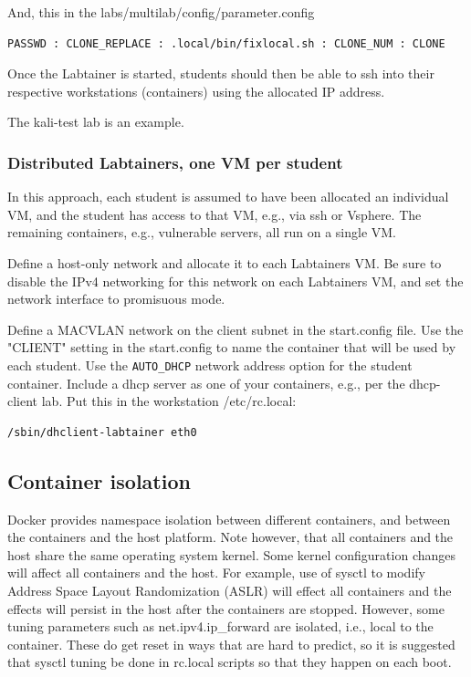 \documentclass[12pt]{article}
\begin{document}
\noindent And, this in the labs/multilab/config/parameter.config
\begin{verbatim}
PASSWD : CLONE_REPLACE : .local/bin/fixlocal.sh : CLONE_NUM : CLONE
\end{verbatim}

Once the Labtainer is started, students should then be able to ssh into their
respective workstations (containers) using the allocated IP address.

The kali-test lab is an example.

\subsubsection {Distributed Labtainers, one VM per student}
In this approach, each student is assumed to have been allocated an
individual VM,
and the student has access to that VM, e.g., via ssh or Vsphere.  The
remaining containers, e.g., vulnerable servers, all run on a single VM.

Define a host-only network and allocate it to each Labtainers VM.  Be sure
to disable the IPv4 networking for this network on each Labtainers VM, and
set the network interface to promisuous mode.

Define a MACVLAN network on the client subnet in the start.config file.
Use the "CLIENT" setting in the start.config to name the container that will
be used by each student. Use the {\tt AUTO\_DHCP} network address option 
for the student container.   Include a dhcp server as one of your containers,
e.g., per the dhcp-client lab.  Put this in the workstation /etc/rc.local:
\begin{verbatim}
/sbin/dhclient-labtainer eth0
\end{verbatim}


\subsection {Container isolation}
Docker provides namespace isolation between different containers, and
between the containers and the host platform.  Note however, that all
containers and the host share the same operating system kernel.  Some
kernel configuration changes will affect all containers and the host.  For example,
use of sysctl to modify Address Space Layout Randomization (ASLR) will effect
all containers and the effects will persist in the host after the containers
are stopped.  However, some tuning parameters such as net.ipv4.ip\_forward are
isolated, i.e., local to the container. These do get reset in ways that are
hard to predict, so it is suggested that sysctl tuning be done in rc.local
scripts so that they happen on each boot.
\end{document}
